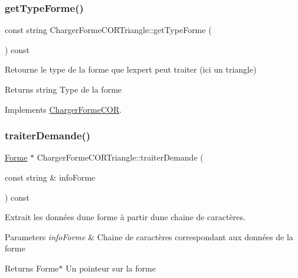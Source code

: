 \subsubsection{\texorpdfstring{get\+Type\+Forme()}{getTypeForme()}}
{\footnotesize\ttfamily const string Charger\+Forme\+C\+O\+R\+Triangle\+::get\+Type\+Forme (\begin{DoxyParamCaption}{ }\end{DoxyParamCaption}) const\hspace{0.3cm}{\ttfamily [virtual]}}



Retourne le type de la forme que l\textquotesingle{}expert peut traiter (ici un triangle) 

\begin{DoxyReturn}{Returns}
string Type de la forme 
\end{DoxyReturn}


Implements \hyperlink{class_charger_forme_c_o_r_ae740eabcd9b3cc3809c1fe5ffd0100a1}{Charger\+Forme\+C\+OR}.

\mbox{\label{class_charger_forme_c_o_r_triangle_aaa2b1605bb747f29a559f966754237a2}} 
\subsubsection{\texorpdfstring{traiter\+Demande()}{traiterDemande()}}
{\footnotesize\ttfamily \hyperlink{class_forme}{Forme} $\ast$ Charger\+Forme\+C\+O\+R\+Triangle\+::traiter\+Demande (\begin{DoxyParamCaption}\item[{const string \&}]{info\+Forme }\end{DoxyParamCaption}) const\hspace{0.3cm}{\ttfamily [virtual]}}



Extrait les données d\textquotesingle{}une forme à partir d\textquotesingle{}une chaine de caractères. 


\begin{DoxyParams}{Parameters}
{\em info\+Forme} & Chaine de caractères correspondant aux données de la forme \\
\hline
\end{DoxyParams}
\begin{DoxyReturn}{Returns}
Forme$\ast$ Un pointeur sur la forme 
\end{DoxyReturn}



